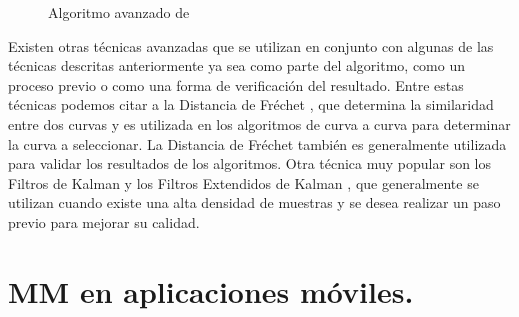 \begin{figure}[h]
\centering
\begin{singlespace}
\end{singlespace}
\caption{Algoritmo avanzado de \cite{quddus2006high}}
\label{fig:algoritmo-avanzado} 
\end{figure}

Existen otras técnicas avanzadas que se utilizan en conjunto con algunas de las técnicas descritas anteriormente ya sea como parte del algoritmo, como un proceso previo o como una forma de verificación del resultado. Entre estas técnicas podemos citar a la Distancia de Fréchet \cite{chen2011approximate,eisner2011algorithms}, que determina la similaridad entre dos curvas y es utilizada en los algoritmos de curva a curva para determinar la curva a seleccionar. La Distancia de Fréchet también es generalmente utilizada para validar los resultados de los algoritmos. Otra técnica muy popular son los Filtros de Kalman y los Filtros Extendidos de Kalman \cite{kim2001adaptive}, que generalmente se utilizan cuando existe una alta densidad de muestras y se desea realizar un paso previo para mejorar su calidad.

\section{MM en aplicaciones móviles.}

